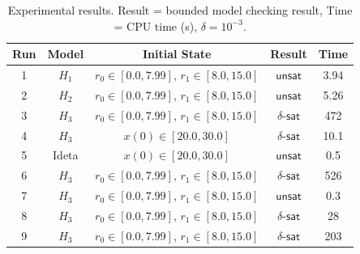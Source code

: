 \begin{table}[!th]
  \centering
  \small
  \begin{tabular}{|c|c|c|c|c|}
    \hline
    \hline
    Run & Model & Initial State   & Result   & Time   \\
    \hline
    \hline
    1 & $H_1$ & $r_0 \in [0.0,7.99]$, $r_1 \in [8.0,15.0]$  & $\mathsf{unsat}$  &  3.94 \\
    2 & $H_2$ & $r_0 \in [0.0,7.99]$, $r_1 \in [8.0,15.0]$   & $\mathsf{unsat}$  &  5.26 \\
    3 & $H_3$ & $r_0 \in [0.0,7.99]$, $r_1 \in [8.0,15.0]$   & $\delta$-$\mathsf{sat}$ &  472 \\ 
    4 & $H_3$ & $x(0) \in [20.0,30.0]$   & $\delta$-$\mathsf{sat}$ &  10.1 \\
    5 & Ideta & $x(0) \in [20.0,30.0]$   & $\mathsf{unsat}$ &  0.5 \\           
    6 & $H_3$ & $r_0 \in [0.0,7.99]$, $r_1 \in [8.0,15.0]$   & $\delta$-$\mathsf{sat}$ &  526 \\ 
    7 & $H_3$ & $r_0 \in [0.0,7.99]$, $r_1 \in [8.0,15.0]$   & $\mathsf{unsat}$ &  0.3 \\ 
    8 & $H_3$ & $r_0 \in [0.0,7.99]$, $r_1 \in [8.0,15.0]$   & $\delta$-$\mathsf{sat}$ &  28 \\ 
    9 & $H_3$ & $r_0 \in [0.0,7.99]$, $r_1 \in [8.0,15.0]$   & $\delta$-$\mathsf{sat}$ & 203 \\ 
    \hline
    \hline
  \end{tabular}
  \caption{\small
  Experimental results.
    Result = bounded model checking result,
    Time = CPU time (s),
    $\delta=10^{-3}$.
}\label{runs}
\end{table}


